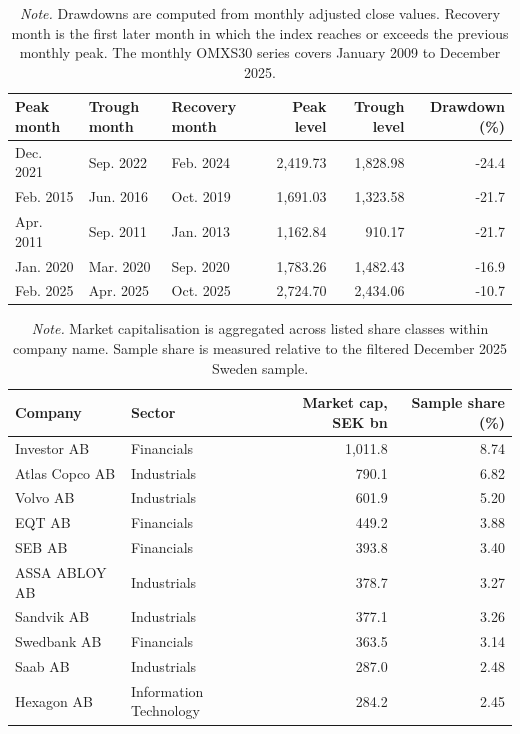 \documentclass[11pt]{article}
\newcommand{\tablenote}[1]{\caption*{\footnotesize \textit{Note.} #1}}
\begin{document}
\begin{table}[H]
\centering
\caption{Largest OMXS30 Drawdowns in the Monthly OMXS30 Series}
\label{tabomxs30drawdowns}
\small
\begin{tabular}{lllrrr}
\toprule
Peak month & Trough month & Recovery month & Peak level & Trough level & Drawdown (\%) \\
\midrule
Dec. 2021 & Sep. 2022 & Feb. 2024 & 2,419.73 & 1,828.98 & -24.4 \\
Feb. 2015 & Jun. 2016 & Oct. 2019 & 1,691.03 & 1,323.58 & -21.7 \\
Apr. 2011 & Sep. 2011 & Jan. 2013 & 1,162.84 & 910.17 & -21.7 \\
Jan. 2020 & Mar. 2020 & Sep. 2020 & 1,783.26 & 1,482.43 & -16.9 \\
Feb. 2025 & Apr. 2025 & Oct. 2025 & 2,724.70 & 2,434.06 & -10.7 \\
\bottomrule
\end{tabular}
\tablenote{Drawdowns are computed from monthly adjusted close values. Recovery month is the first later month in which the index reaches or exceeds the previous monthly peak. The monthly OMXS30 series covers January 2009 to December 2025.}
\end{table}


\begin{table}[H]
\centering
\caption{Largest Companies in the Filtered Sweden Sample, December 2025}
\label{tabtopcompanies2025}
\small
\begin{tabularx}{0.92\textwidth}{Xlrr}
\toprule
Company & Sector & Market cap, SEK bn & Sample share (\%) \\
\midrule
Investor AB & Financials & 1,011.8 & 8.74 \\
Atlas Copco AB & Industrials & 790.1 & 6.82 \\
Volvo AB & Industrials & 601.9 & 5.20 \\
EQT AB & Financials & 449.2 & 3.88 \\
SEB AB & Financials & 393.8 & 3.40 \\
ASSA ABLOY AB & Industrials & 378.7 & 3.27 \\
Sandvik AB & Industrials & 377.1 & 3.26 \\
Swedbank AB & Financials & 363.5 & 3.14 \\
Saab AB & Industrials & 287.0 & 2.48 \\
Hexagon AB & Information Technology & 284.2 & 2.45 \\
\bottomrule
\end{tabularx}
\tablenote{Market capitalisation is aggregated across listed share classes within company name. Sample share is measured relative to the filtered December 2025 Sweden sample.}
\end{table}
\end{document}
